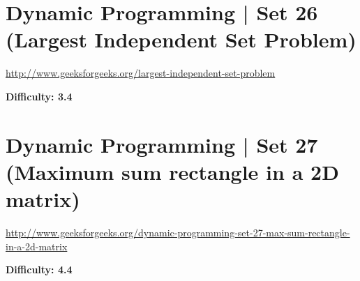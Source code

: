 \RayNotesBegin



\RayNotesEnd

\textbf{}



\section{Dynamic Programming | Set 26 (Largest Independent Set Problem)
  \label{secGFGDPSet26LargestIndepSetProb}}

\url{http://www.geeksforgeeks.org/largest-independent-set-problem}

\textbf{Difficulty: 3.4}


\textbf{}

\RayNotesBegin



\RayNotesEnd

\textbf{}



\section{Dynamic Programming | Set 27 (Maximum sum rectangle in a 2D matrix)
  \label{secGFGDPSet27MaxSumRec2DMat}}

\url{http://www.geeksforgeeks.org/dynamic-programming-set-27-max-sum-rectangle-in-a-2d-matrix}

\textbf{Difficulty: 4.4}


\textbf{}

\RayNotesBegin



\RayNotesEnd

\textbf{}




